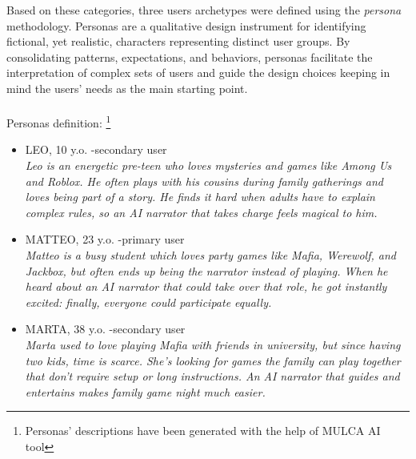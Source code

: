 \documentclass[12pt]{article}
\begin{document}
Based on these categories, three users archetypes were defined using the \textit{persona} methodology. Personas are a qualitative design instrument for identifying fictional, yet realistic, characters representing distinct user groups. By consolidating patterns, expectations, and behaviors, personas facilitate the interpretation of complex sets of users and guide the design choices keeping in mind the users' needs as the main starting point.
\\
\\Personas definition:
\footnote{Personas' descriptions have been generated with the help of MULCA AI tool}
\begin{itemize}
    \item LEO, 10 y.o. -secondary user 
    \\ \textit{Leo is an energetic pre-teen who loves mysteries and games like Among Us and Roblox. He often plays with his cousins during family gatherings and loves being part of a story. He finds it hard when adults have to explain complex rules, so an AI narrator that takes charge feels magical to him.}
    \item MATTEO, 23 y.o. -primary user
    \\ \textit{Matteo is a busy student which loves party games like Mafia, Werewolf, and Jackbox, but often ends up being the narrator instead of playing. When he heard about an AI narrator that could take over that role, he got instantly excited: finally, everyone could participate equally.}
    \item MARTA, 38 y.o. -secondary user
    \\ \textit{Marta used to love playing Mafia with friends in university, but since having two kids, time is scarce. She’s looking for games the family can play together that don’t require setup or long instructions. An AI narrator that guides and entertains makes family game night much easier.}
\end{itemize}
\end{document}
